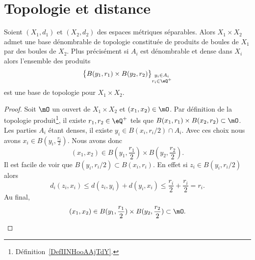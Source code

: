 
\section{Topologie et distance}


\begin{lemma}   \label{LemDUJXooWsnmpL}
	Soient \( (X_1,d_1)\) et \( (X_2,d_2)\) des espaces métriques séparables. Alors \( X_1\times X_2\) admet une base dénombrable de topologie constituée de produits de boules de \( X_1\) par des boules de \( X_2\). Plus précisément si \( A_i\) est dénombrable et dense dans \( X_i\) alors l'ensemble des produits
	\begin{equation}
		\big\{ B(y_1,r_1)\times B(y_2,r_2)\big\}_{\substack{y_i\in A_i\\r_i\in \eQ^+}}
	\end{equation}
	est une base de topologie pour \( X_1\times X_2\).
\end{lemma}

\begin{proof}
	Soit \( \mO\) un ouvert de \( X_1\times X_2\) et \( (x_1,x_2)\in \mO\). Par définition de la topologie produit\footnote{Définition~\ref{DefIINHooAAjTdY}.}, il existe \( r_1,r_2\in \eQ^+\) tels que \( B(x_1,r_1)\times B(x_2,r_2)\subset\mO\). Les parties \( A_i\) étant denses, il existe \( y_i\in B(x_i,r_i/2)\cap A_i\). Avec ces choix nous avons \( x_i\in B(y_i,\frac{ r_i }{2})\). Nous avons donc
	\begin{equation}
		(x_1,x_2)\in B(y_1,\frac{ r_1 }{ 2 })\times B(y_2,\frac{ r_2 }{2}).
	\end{equation}
	Il est facile de voir que \( B(y_i,r_i/2)\subset B(x_i,r_i)\). En effet si \( z_i\in B(y_i,r_i/2)\) alors
	\begin{equation}
		d_i(z_i,x_i)\leq d(z_i,y_i)+d(y_i,x_i)\leq \frac{ r_i }{2}+\frac{ r_i }{2}=r_i.
	\end{equation}
	Au final,
	\begin{equation}
		(x_1,x_2)\in B(y_1,\frac{ r_1 }{ 2 })\times B(y_2,\frac{ r_2 }{2})\subset \mO.
	\end{equation}
\end{proof}


